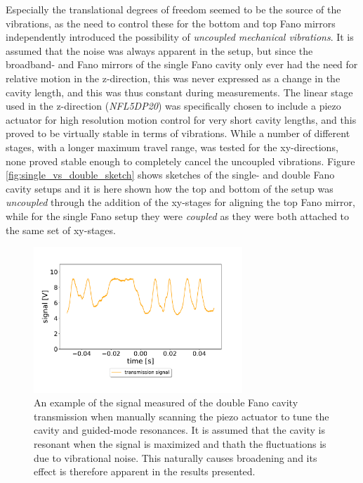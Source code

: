 Especially the translational degrees of freedom seemed to be the source of the vibrations, as the need to control these for the bottom and top Fano mirrors independently introduced the possibility of \emph{uncoupled mechanical vibrations}. It is assumed that the noise was always apparent in the setup, but since the broadband- and Fano mirrors of the single Fano cavity only ever had the need for relative motion in the z-direction, this was never expressed as a change in the cavity length, and this was thus constant during measurements. The linear stage used in the z-direction (\emph{NFL5DP20}) was specifically chosen to include a piezo actuator for high resolution motion control for very short cavity lengths, and this proved to be virtually stable in terms of vibrations. While a number of different stages, with a longer maximum travel range, was tested for the xy-directions, none proved stable enough to completely cancel the uncoupled vibrations. Figure \ref{fig:single_vs_double_sketch} shows sketches of the single- and double Fano cavity setups and it is here shown how the top and bottom of the setup was \emph{uncoupled} through the addition of the xy-stages for aligning the top Fano mirror, while for the single Fano setup they were \emph{coupled} as they were both attached to the same set of xy-stages. 

\begin{figure}[h!]
    \centering
    \includegraphics[width=0.7\textwidth]{figures/results/noise_on_resonance.pdf}
    \caption{ An example of the signal measured of the double Fano cavity transmission when manually scanning the piezo actuator to tune the cavity and guided-mode resonances. It is assumed that the cavity is resonant when the signal is maximized and thath the fluctuations is due to vibrational noise. This naturally causes broadening and its effect is therefore apparent in the results presented.}
    \label{fig:noise_on_resonance}
\end{figure}

